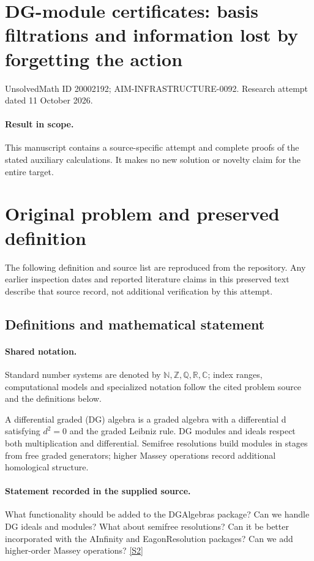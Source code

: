 \documentclass[11pt]{article}
\begin{document}
\section*{DG-module certificates: basis filtrations and information lost by forgetting the action}
\noindent UnsolvedMath ID 20002192; AIM-INFRASTRUCTURE-0092. Research attempt dated 11 October 2026.
\paragraph{Result in scope.}This manuscript contains a source-specific attempt and complete proofs of the stated auxiliary calculations. It makes no new solution or novelty claim for the entire target.
\section{Original problem and preserved definition}
The following definition and source list are reproduced from the repository. Any earlier inspection dates and reported literature claims in this preserved text describe that source record, not additional verification by this attempt.
\subsection{Definitions and mathematical statement}

\paragraph{Shared notation.}Standard number systems are denoted by $\mathbb N,\mathbb Z,\mathbb Q,\mathbb R,\mathbb C$; index ranges, computational models and specialized notation follow the cited problem source and the definitions below.


A differential graded (DG) algebra is a graded algebra with a differential d satisfying $d^2=0$ and the graded Leibniz rule. DG modules and ideals respect both multiplication and differential. Semifree resolutions build modules in stages from free graded generators; higher Massey operations record additional homological structure.
\paragraph{Statement recorded in the supplied source.}
What functionality should be added to the DGAlgebras package? Can we handle DG ideals and modules? What about semifree resolutions? Can it be better incorporated with the AInfinity and EagonResolution packages? Can we add higher-order Massey operations? \href{http://aimpl.org/macaulay2efie/3/}{[S2]}
\end{document}
